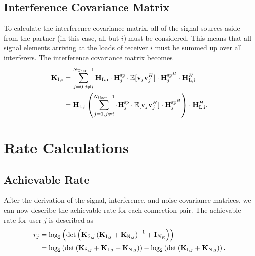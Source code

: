 \subsection{Interference Covariance Matrix}
\label{sec:int_cov}

To calculate the interference covariance matrix, all of the signal sources aside from the partner (in this case, all but $i$) must be considered.
This means that all signal elements arriving at the loads of receiver $i$ must be summed up over all interferers.
The interference covariance matrix becomes 
\begin{align}
\label{eq:interf_cov}\nonumber
\mat{K}_{\text{I},i}%
 	&= \sum_{j=0,j\neq i}^{N_\text{User}-1} 
	\mat{H}_\text{L,i} \cdot \mat{H}_{j}^{\text{sp}} \cdot 
	\mathbb{E}[\vec{v}_{j}\vec{v}_{j}^H] \cdot 
	\mat{H}_{j}^{\text{sp}^H} \cdot \mat{H}_\text{L,i}^H\\
	&= \mat{H}_\text{L,i} \left(\sum_{j=1,j\neq i}^{N_\text{User}-1} 
	\cdot \mat{H}_{j}^{\text{sp}} \cdot 
	\mathbb{E}[\vec{v}_{j}\vec{v}_{j}^H] \cdot 
	\mat{H}_{j}^{\text{sp}^H}\right) \cdot \mat{H}_\text{L,i}^H.
\end{align}




\section{Rate Calculations}
\label{sec:rates}

\subsection{Achievable Rate}
\label{sec:achiev_rate}
After the derivation of the signal, interference, and noise covariance matrices, we can now describe the achievable rate for each connection pair.
The achievable rate for user $j$ is described as
\begin{align}
\label{eq:achiev_rate}
\nonumber
r_j &= \text{log}_2\left(\text{det}\left(\mathbf{K}_{\text{S},j}\left(\mathbf{K}_{\text{I},j}+\mathbf{K}_{\text{N},j}\right)^{-1}+\mathbf{I}_{N_R}\right)\right)\\
 &=\text{log}_2\left(
	\text{det}\left(\mathbf{K}_{\text{S},j}+
		\mathbf{K}_{\text{I},j}+\mathbf{K}_{\text{N},j}\right)\right) -
	\text{log}_2\left(\text{det}\left(\mathbf{K}_{\text{I},j}+\mathbf{K}_{\text{N},j}\right)\right).
\end{align}


